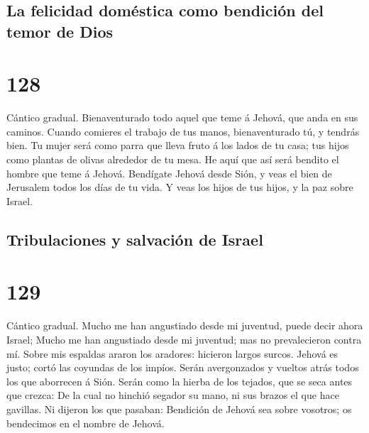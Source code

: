 \hypertarget{la-felicidad-domuxe9stica-como-bendiciuxf3n-del-temor-de-dios}{%
\subsection{La felicidad doméstica como bendición del temor de
Dios}\label{la-felicidad-domuxe9stica-como-bendiciuxf3n-del-temor-de-dios}}

\hypertarget{section-127}{%
\section{128}\label{section-127}}

 Cántico gradual. Bienaventurado todo aquel que teme á
Jehová, que anda en sus caminos.  Cuando comieres el
trabajo de tus manos, bienaventurado tú, y tendrás bien. 
Tu mujer será como parra que lleva fruto á los lados de tu casa; tus
hijos como plantas de olivas alrededor de tu mesa.  He
aquí que así será bendito el hombre que teme á Jehová. 
Bendígate Jehová desde Sión, y veas el bien de Jerusalem todos los días
de tu vida.  Y veas los hijos de tus hijos, y la paz sobre
Israel.

\hypertarget{tribulaciones-y-salvaciuxf3n-de-israel}{%
\subsection{Tribulaciones y salvación de
Israel}\label{tribulaciones-y-salvaciuxf3n-de-israel}}

\hypertarget{section-128}{%
\section{129}\label{section-128}}

 Cántico gradual. Mucho me han angustiado desde mi
juventud, puede decir ahora Israel;  Mucho me han
angustiado desde mi juventud; mas no prevalecieron contra mí.
 Sobre mis espaldas araron los aradores: hicieron largos
surcos.  Jehová es justo; cortó las coyundas de los
impíos.  Serán avergonzados y vueltos atrás todos los que
aborrecen á Sión.  Serán como la hierba de los tejados,
que se seca antes que crezca:  De la cual no hinchió
segador su mano, ni sus brazos el que hace gavillas.  Ni
dijeron los que pasaban: Bendición de Jehová sea sobre vosotros; os
bendecimos en el nombre de Jehová.

